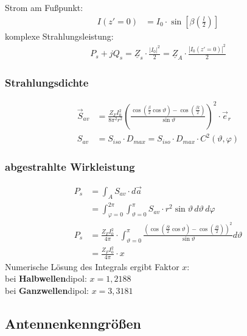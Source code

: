 Strom am Fußpunkt:
\begin{align*}
	I(z'=0) & = I_0\cdot\sin\left[\beta\left(\frac{l}{2}\right)\right]
\end{align*}
komplexe Strahlungsleistung:
\begin{align*}
	P_s +jQ_s = \underline{Z}_s\cdot \frac{|I_0|^2}{2} = \underline{Z}_A \cdot \frac{|I_0(z'=0)|^2}{2}
\end{align*}
\subsubsection{Strahlungsdichte}
\begin{align*}
    \vec{S}_{av} & = \frac{Z_FI_0^2}{8\pi^2 r^2}\left(\frac{\cos\left(\frac{\beta }{2}\cos\vartheta\right)-\cos\left(\frac{\beta l}{2}\right)}{\sin\vartheta}\right)^2\cdot\vec{e}_r                               \\
    S_{av} & = S_{iso} \cdot D_{max} = S_{iso} \cdot D_{max} \cdot C^2(\vartheta, \varphi)
\end{align*}
\subsubsection{abgestrahlte Wirkleistung}
\begin{align*}
                P_{s} & = \int_A S_{av}\cdot d\vec{a}                                                                                                                                                              \\
                 & = \int^{2\pi}_{\varphi = 0}\int^{\pi}_{\vartheta = 0} S_{av}\cdot r^2 \sin\vartheta \, d\vartheta \, d\varphi\\
 P_{s}          & = \frac{Z_{F}I_0^2}{4\pi}\cdot\int^{\pi}_{\vartheta=0}\frac{\left(\cos\left(\frac{\beta l}{2}\cos\vartheta\right)-\cos\left(\frac{\beta l}{2}\right)\right)^2}{\sin\vartheta}d\vartheta\\
 &= \frac{Z_{F}I_0^2}{4\pi}\cdot x
\end{align*}
Numerische Lösung des Integrals ergibt Faktor $ x $:\\
bei \textbf{Halbwellen}dipol: $ x=1,2188 $\\
bei \textbf{Ganzwellen}dipol: $ x=3,3181$
\subsection{Antennenkenngrößen}



